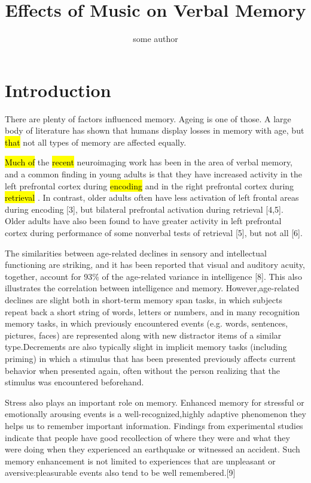 \documentclass{article}
\title{Effects of Music on Verbal Memory}
\author{some author}
\begin{document}
\maketitle{}

\section{Introduction}

There are plenty of factors influenced memory. Ageing is one of those. A large body of literature has shown that humans display losses in memory with age, but \hl{that} not all types of memory are affected equally. 

\hl{Much of}  the \hl{recent}  neuroimaging work has been in the area of verbal memory, and a common finding in young adults is that they have increased activity in the left prefrontal cortex during \hl{encoding}  and in the right prefrontal cortex during \hl{retrieval}  \autocite{cabezaImagingCognitionEmpirical1997,gradyc.l.NeuroimagingActivationFrontal1999}. In contrast, older adults often have less activation of left frontal areas during encoding [3], but bilateral prefrontal activation during retrieval [4,5]. Older adults have also been found to have greater activity in left prefrontal cortex during performance of some nonverbal tests of retrieval [5], but not all [6].

The similarities between age-related declines in sensory and intellectual functioning are striking, and it has been reported that visual and auditory acuity, together, account for 93\% of the age-related variance in intelligence [8]. This also illustrates the correlation between intelligence and memory. However,age-related declines are  slight both in short-term memory span tasks, in which subjects repeat back a short string of words, letters or  numbers, and in many recognition memory tasks, in which  previously encountered events (e.g. words, sentences, pictures, faces) are represented along with new distractor items of a similar type.Decrements are also typically slight in implicit memory tasks (including priming) in which a stimulus that has been presented previously affects current behavior when presented again, often without the person realizing that the stimulus was encountered beforehand. 

Stress also plays an important role on memory. Enhanced memory for stressful or emotionally arousing events is a well-recognized,highly adaptive phenomenon they helps us to remember important information. Findings from experimental studies indicate that people have good recollection of where they were and what they were doing when they experienced an earthquake or witnessed an accident. Such memory enhancement is not limited to experiences that are unpleasant or aversive:pleasurable events also tend to be well remembered.[9] 
\end{document}
